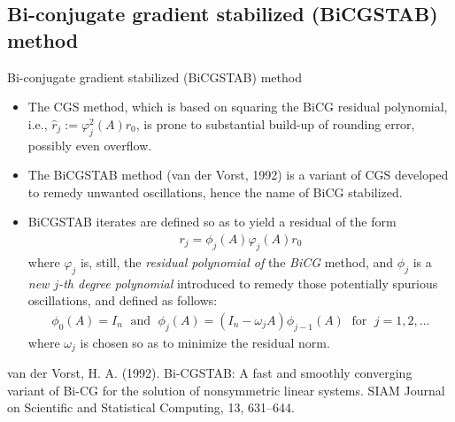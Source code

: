 \documentclass[t,usepdftitle=false]{beamer}
\begin{document}
\subsection{Bi-conjugate gradient stabilized (BiCGSTAB) method}
\begin{frame}{Bi-conjugate gradient stabilized (BiCGSTAB) method}
\begin{itemize}
\item The CGS method, which is based on squaring the BiCG residual polynomial, i.e., $\hat{r}_j:=\varphi_j^2(A)r_0$, is prone to substantial build-up of rounding error, possibly even overflow.
\item The BiCGSTAB method (van der Vorst, 1992) is a variant of CGS developed to remedy unwanted oscillations, hence the name of BiCG stabilized.
\item[] BiCGSTAB iterates are defined so as to yield a residual of the form
\begin{align*}
r_j=\phi_j(A)\varphi_j(A)r_0
\end{align*}
where $\varphi_j$ is, still, the \textit{residual polynomial of} the \textit{BiCG} method, and $\phi_j$ is a \textit{new $j$-th degree polynomial} introduced to remedy those potentially spurious oscillations, and defined as follows:
\begin{align*}
\phi_0(A)=I_n
\;\text{ and }\;
\phi_j(A)=(I_n-\omega_jA)\phi_{j-1}(A)
\;\text{ for }\;
j=1,2,\dots
\end{align*}
where $\omega_j$ is chosen so as to minimize the residual norm.
\end{itemize}\smallskip
\tiny{van der Vorst, H. A. (1992). Bi-CGSTAB: A fast and smoothly converging variant of Bi-CG for the solution
of nonsymmetric linear systems. SIAM Journal on Scientific and Statistical Computing, 13, 631–644.}
\end{frame}
\end{document}
